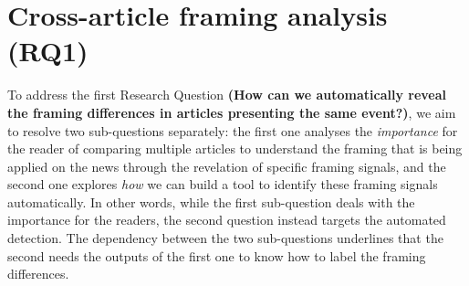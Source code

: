 



\section{Cross-article framing analysis (RQ1)}
\label{sec:prop_rq1}

To address the first Research Question
\textbf{(How can we automatically reveal the framing differences in articles presenting the same event?)}, we aim to resolve two sub-questions separately: the first one analyses the \emph{importance} for the reader of comparing multiple articles to understand the framing that is being applied on the news through the revelation of specific framing signals, and the second one explores \emph{how} we can build a tool to identify these framing signals automatically.
In other words, while the first sub-question deals with the importance for the readers, the second question instead targets the automated detection.
The dependency between the two sub-questions underlines that the second needs the outputs of the first one to know how to label the framing differences.



